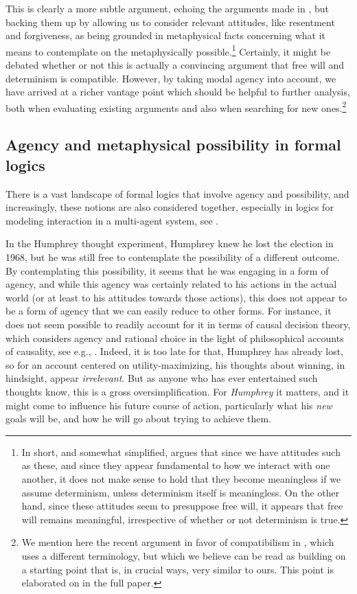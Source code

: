 \documentclass{article}
\begin{document}
{This is clearly a more subtle argument, echoing the arguments made in \cite{strawsonfree}, but backing them up by allowing us to consider relevant attitudes, like resentment and forgiveness, as being grounded in metaphysical facts concerning what it means to contemplate on the metaphysically possible.\footnote{In short, and somewhat simplified, \cite{strawsonfree} argues that since we have attitudes such as these, and since they appear fundamental to how we interact with one another, it does not make sense to hold that they become meaningless if we assume determinism, unless determinism itself is meaningless. On the other hand, since these attitudes seem to presuppose free will, it appears that free will remains meaningful, irrespective of whether or not determinism is true.} Certainly, it might be debated whether or not this is actually a convincing argument that free will and determinism is compatible. However, by taking modal agency into account, we have arrived at a richer vantage point which should be 
helpful to further analysis, both when evaluating existing arguments and also when searching for new ones.\footnote{We mention here the recent argument in favor of compatibilism in \cite{Listfree}, which uses a different terminology, but which we believe can be read as building on a starting point that is, in crucial ways, very similar to ours. This point is elaborated on in the full paper.} }

\subsection*{Agency and metaphysical possibility in formal logics}

There is a vast landscape of formal logics that involve agency and possibility, and increasingly, these notions are also considered together, especially in logics for modeling interaction in a multi-agent system, see \cite{IMAS,Benthem}.

In the Humphrey thought experiment, Humphrey knew he lost the election in 1968, but he was still free to contemplate the possibility of a different outcome. By contemplating this possibility, it seems that he was engaging in a form of agency, and while this agency was certainly related to his actions in the actual world (or at least to his attitudes towards those actions), this does not appear to be a form of agency that we can easily reduce to other forms. For instance, it does not seem possible to readily account for it in terms of causal decision theory, which considers agency and rational choice in the light of philosophical accounts of causality, see e.g., \cite{joyce}. Indeed, it is too late for that, Humphrey has already lost, so for an account centered on utility-maximizing, his thoughts about winning, in hindsight, appear \emph{irrelevant}. But as anyone who has ever entertained such thoughts know, this is a gross oversimplification. For \emph{Humphrey} it matters, and it might come to influence his future course of action, particularly what his \emph{new} goals will be, and how he will go about trying to achieve them.
\end{document}
